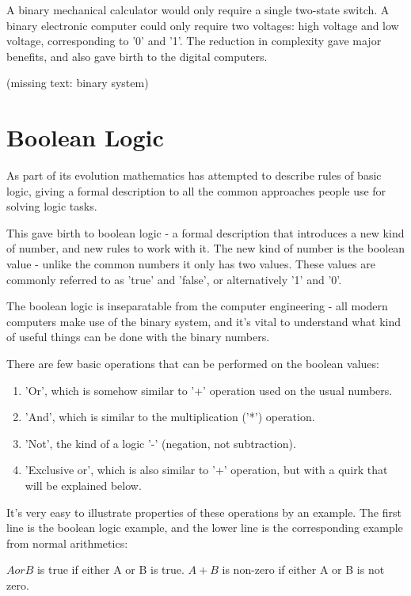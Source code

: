 A binary mechanical calculator would only require a single two-state switch. A binary electronic computer could only require two voltages: high voltage and low voltage, corresponding to '0' and '1'. The reduction in complexity gave major benefits, and also gave birth to the digital computers.

(missing text: binary system)







\section{Boolean Logic}
As part of its evolution mathematics has attempted to describe rules of basic logic, giving a formal description to all the common approaches people use for solving logic tasks.

This gave birth to boolean logic - a formal description that introduces a new kind of number, and new rules to work with it. The new kind of number is the boolean value - unlike the common numbers it only has two values. These values are commonly referred to as 'true' and 'false', or alternatively '1' and '0'.

The boolean logic is inseparatable from the computer engineering - all modern computers make use of the binary system, and it's vital to understand what kind of useful things can be done with the binary numbers.

There are few basic operations that can be performed on the boolean values:
\begin{enumerate}
	\item 'Or', which is somehow similar to '+' operation used on the usual numbers.
	\item 'And', which is similar to the multiplication ('*') operation.
	\item 'Not', the kind of a logic '-' (negation, not subtraction).
	\item 'Exclusive or', which is also similar to '+' operation, but with a quirk that will be explained below.
\end{enumerate}

It's very easy to illustrate properties of these operations by an example. The first line is the boolean logic example, and the lower line is the corresponding example from normal arithmetics:

$A or B$ is true if either A or B is true.
$A + B$ is non-zero if either A or B is not zero.


